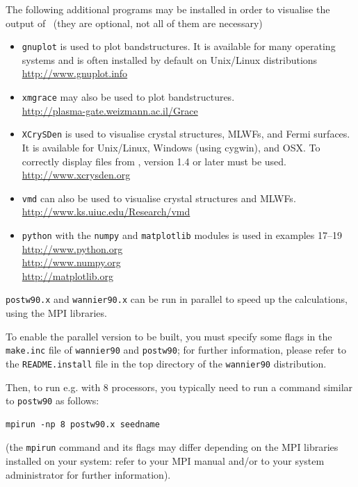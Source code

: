 \documentclass[a4paper,11pt,twoside]{article}
\begin{document}
The following additional programs may be installed in order to
visualise the output of \wannier\ (they are optional, not all of them
are necessary)
\begin{itemize}
\item {\tt gnuplot} is used to plot bandstructures. It is 
available for many operating systems and is often installed by default on
 Unix/Linux distributions\\
\url{http://www.gnuplot.info}
\item {\tt xmgrace} may also be used to plot bandstructures.\\
\url{http://plasma-gate.weizmann.ac.il/Grace}
\item {\tt XCrySDen} is used to visualise crystal structures, MLWFs,
  and Fermi surfaces. It is available for Unix/Linux, 
  Windows (using cygwin), and OSX. To correctly display 
files from \wannier, version 1.4 or later must be used.\\
\url{http://www.xcrysden.org}
\item {\tt vmd} can also be used to visualise crystal structures and
  MLWFs.\\
\url{http://www.ks.uiuc.edu/Research/vmd}
\item{\tt python} with the {\tt numpy} and {\tt matplotlib} modules
  is used in examples 17--19\\
  \url{http://www.python.org}\\
  \url{http://www.numpy.org}\\
  \url{http://matplotlib.org}
\end{itemize}

\label{sec:parallel}
{\tt postw90.x} and {\tt wannier90.x} can be run in parallel to speed up
the calculations, using the MPI libraries.

To enable the parallel version to be built, you must specify some
flags in the {\tt make.inc} file of {\tt wannier90} and {\tt postw90};
for further information, please refer to the {\tt README.install} file
in the top directory of the {\tt wannier90} distribution.

Then, to run e.g. with 8 processors, you typically need to run a
command similar to {\tt postw90} as follows:
\begin{verbatim}
mpirun -np 8 postw90.x seedname
\end{verbatim}
(the {\tt mpirun} command and its flags may differ depending on the
MPI libraries installed on your system: refer to your MPI manual and/or to
your system administrator for further information).
\end{document}
